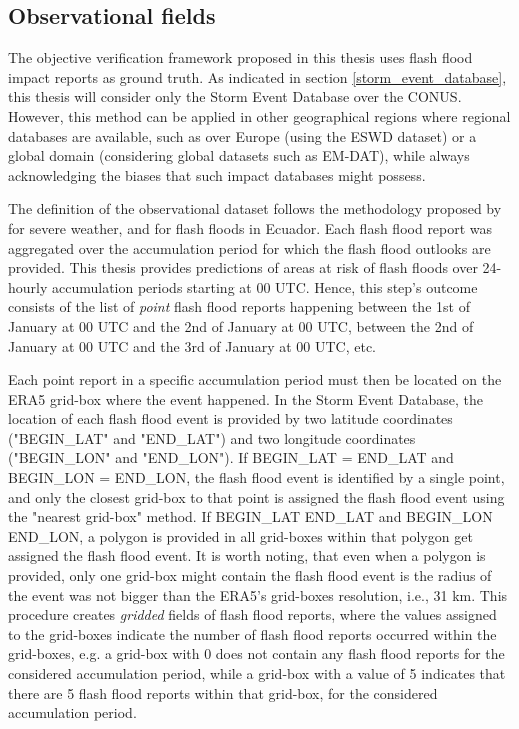 \subsection{Observational fields}
The objective verification framework proposed in this thesis uses flash flood impact reports as ground truth. As indicated in section \ref{storm_event_database}, this thesis will consider only the Storm Event Database over the CONUS. However, this method can be applied in other geographical regions where regional databases are available, such as over Europe (using the ESWD dataset) or a global domain (considering global datasets such as EM-DAT), while always acknowledging the biases that such impact databases might possess. 

The definition of the observational dataset follows the methodology proposed by \citep{Tsonevsky_2018} for severe weather, and \citep{Pillosu_2024} for flash floods in Ecuador. Each flash flood report was aggregated over the accumulation period for which the flash flood outlooks are provided. This thesis provides predictions of areas at risk of flash floods over 24-hourly accumulation periods starting at 00 UTC. Hence, this step's outcome consists of the list of \textit{point} flash flood reports happening between the 1st of January at 00 UTC and the 2nd of January at 00 UTC, between the 2nd of January at 00 UTC and the 3rd of January at 00 UTC, etc. 

Each point report in a specific accumulation period must then be located on the ERA5 grid-box where the event happened. In the Storm Event Database, the location of each flash flood event is provided by two latitude coordinates ("BEGIN\_LAT" and "END\_LAT") and two longitude coordinates ("BEGIN\_LON" and "END\_LON"). If BEGIN\_LAT = END\_LAT and BEGIN\_LON = END\_LON, the flash flood event is identified by a single point, and only the closest grid-box to that point is assigned the flash flood event using the "nearest grid-box" method. If BEGIN\_LAT \ne END\_LAT and BEGIN\_LON \ne END\_LON, a polygon is provided in all grid-boxes within that polygon get assigned the flash flood event. It is worth noting, that even when a polygon is provided, only one grid-box might contain the flash flood event is the radius of the event was not bigger than the ERA5's grid-boxes resolution, i.e., 31 km. This procedure creates \textit{gridded} fields of flash flood reports, where the values assigned to the grid-boxes indicate the number of flash flood reports occurred within the grid-boxes, e.g. a grid-box with 0 does not contain any flash flood reports for the considered accumulation period, while a grid-box with a value of 5 indicates that there are 5 flash flood reports within that grid-box, for the considered accumulation period.

